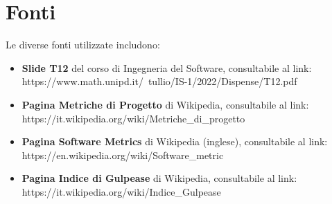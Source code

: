 \section{Fonti}
Le diverse fonti utilizzate includono:
\begin{itemize}
    \item \textbf{Slide T12} del corso di Ingegneria del Software, consultabile al link: https://www.math.unipd.it/~tullio/IS-1/2022/Dispense/T12.pdf
    \item \textbf{Pagina Metriche di Progetto} di Wikipedia, consultabile al link: https://it.wikipedia.org/wiki/Metriche_di_progetto
    \item \textbf{Pagina Software Metrics} di Wikipedia (inglese), consultabile al link: https://en.wikipedia.org/wiki/Software_metric
    \item \textbf{Pagina Indice di Gulpease} di Wikipedia, consultabile al link: https://it.wikipedia.org/wiki/Indice_Gulpease
\end{itemize}